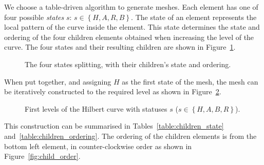 We choose a table-driven algorithm to generate meshes. Each element has one of four possible
\textit{states} \(s\): \(s \in \left \{H, A, R, B \right \} \). The state of an element represents
the local pattern of the curve inside the element. This state determines the state and ordering of
the four children elements obtained when increasing the level of the curve. The four states and
their resulting children are shown in Figure~\ref{fig:hilbert_splits}.

\begin{figure}[H]
    \centering
    \hfill
    \hfill
    \hfill
    \caption{The four states splitting, with their children's state and ordering.}\label{fig:hilbert_splits}
\end{figure}

\noindent
When put together, and assigning \(H\) as the first state of the mesh, the mesh can be iteratively
constructed to the required level as shown in Figure~\ref{fig:hilbert_levels}.

\begin{figure}[H]
    \centering
    \subfloat[Level 0]
    {\label{fig:hilbert_l0}}
    \hfill
    \subfloat[Level 1]
    {\label{fig:hilbert_l1}}
    \hfill
    \subfloat[Level 2]
    {\label{fig:hilbert_l2}}
    \caption{First levels of the Hilbert curve with statuses \(s\) (\(s \in \left \{ H, A , B , R \right \} \)).}\label{fig:hilbert_levels}
\end{figure}

\noindent
This construction can be summarised in Tables~\ref{table:children_state}
and~\ref{table:children_ordering}. The ordering of the children elements is from the bottom left
element, in counter-clockwise order as shown in Figure~\ref{fig:child_order}. 

